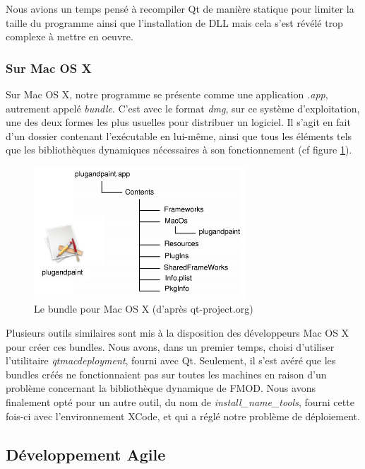 Nous avions un temps pensé à recompiler Qt de manière statique pour limiter la taille du programme ainsi que l'installation de DLL mais cela s'est révélé trop complexe à mettre en oeuvre.

\subsubsection{Sur Mac OS X}

Sur Mac OS X, notre programme se présente comme une application \textit{.app}, autrement appelé \textit{bundle}. C'est avec le format \textit{dmg}, sur ce système d'exploitation, une des deux formes les plus usuelles pour distribuer un logiciel. Il s'agit en fait d'un dossier contenant l'exécutable en lui-même, ainsi que tous les éléments tels que les bibliothèques dynamiques nécessaires à son fonctionnement (cf figure \ref{app_mac_os}).

\begin{figure}[H]
\begin{center}
\includegraphics[width=300px]{bundle_mac.png}
\caption{Le bundle pour Mac OS X (d'après qt-project.org)}
\label{app_mac_os}
\end{center}
\end{figure}

Plusieurs outils similaires sont mis à la disposition des développeurs Mac OS X pour créer ces bundles. Nous avons, dans un premier temps, choisi d'utiliser l'utilitaire \textit{qtmacdeployment}, fourni avec Qt. Seulement, il s'est avéré que les bundles créés ne fonctionnaient pas sur toutes les machines en raison d'un problème concernant la bibliothèque dynamique de FMOD. Nous avons finalement opté pour un autre outil, du nom de \textit{install\_name\_tools}, fourni cette fois-ci avec l'environnement XCode, et qui a réglé notre problème de déploiement.

\subsection{Développement Agile}

